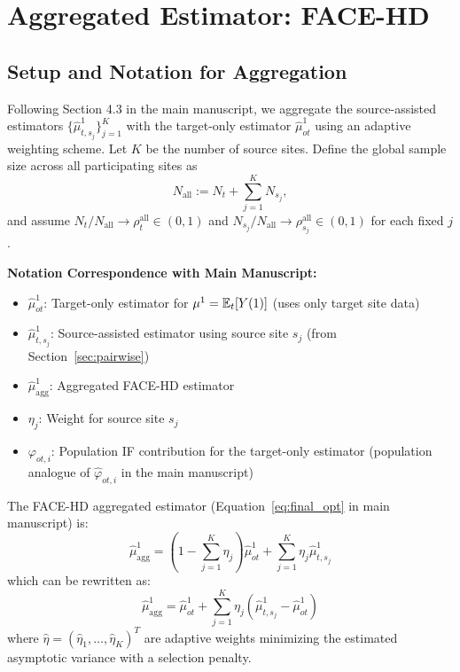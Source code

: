\documentclass{article}
\begin{document}
\section{Aggregated Estimator: FACE-HD}
\label{sec:agg_proofs}

\subsection{Setup and Notation for Aggregation}

Following Section 4.3 in the main manuscript, we aggregate the source-assisted estimators $\{\widehat{\mu}^1_{t,s_j}\}_{j=1}^K$ with the target-only estimator $\widehat{\mu}^1_{ot}$ using an adaptive weighting scheme. Let $K$ be the number of source sites.
Define the global sample size across all participating sites as
\[
N_{\mathrm{all}} := N_t + \sum_{j=1}^K N_{s_j},
\]
and assume $N_t/N_{\mathrm{all}} \to \rho_t^{\mathrm{all}} \in (0,1)$ and $N_{s_j}/N_{\mathrm{all}} \to \rho_{s_j}^{\mathrm{all}} \in (0,1)$ for each fixed $j$.

\textbf{Notation Correspondence with Main Manuscript:}
\begin{itemize}
    \item $\widehat{\mu}^1_{ot}$: Target-only estimator for $\mu^1 = \operatorname{\mathbb{E}}_t[Y(1)]$ (uses only target site data)
    \item $\widehat{\mu}^1_{t,s_j}$: Source-assisted estimator using source site $s_j$ (from Section~\ref{sec:pairwise})
    \item $\widehat{\mu}^1_{\text{agg}}$: Aggregated FACE-HD estimator
    \item $\eta_j$: Weight for source site $s_j$
    \item $\varphi_{ot,i}$: Population IF contribution for the target-only estimator (population analogue of $\widehat{\varphi}_{ot,i}$ in the main manuscript)
\end{itemize}

The FACE-HD aggregated estimator (Equation~\eqref{eq:final_opt} in main manuscript) is:
\[
\widehat{\mu}^1_{\text{agg}} = \left(1 - \sum_{j=1}^K \eta_j\right) \widehat{\mu}^1_{ot} + \sum_{j=1}^K \eta_j \widehat{\mu}^1_{t,s_j}
\]
which can be rewritten as:
\[
\widehat{\mu}^1_{\text{agg}} = \widehat{\mu}^1_{ot} + \sum_{j=1}^K \eta_j \left( \widehat{\mu}^1_{t,s_j} - \widehat{\mu}^1_{ot} \right)
\]
where $\widehat{\eta} = (\widehat{\eta}_1, \ldots, \widehat{\eta}_K)^T$ are adaptive weights minimizing the estimated asymptotic variance with a selection penalty.
\end{document}
